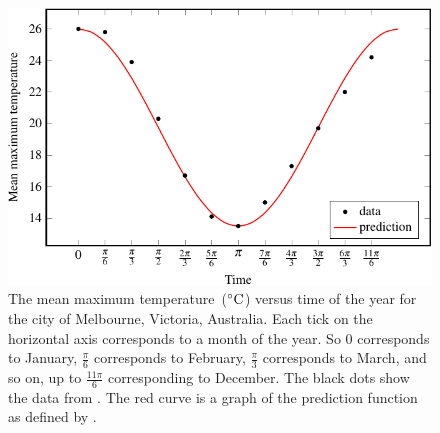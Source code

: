\documentclass[a4paper,oneside,12pt]{article}
\begin{document}

\begin{table}[!htbp]
\centering

\caption{%
  The mean maximum temperature~($\degreec{}$) of each month for the city of
  Melbourne, Victoria, Australia.  The mean was calculated using
  temperature data for the years from $1855$ to $2015$.  The mean
  temperatures are provided by the Bureau of Meteorology of
  Australia.
}
\label{tab:trigonometric:mean_maximum_temperature}
\end{table}

\begin{figure}[!htbp]
\centering
\includegraphics[scale=1.1]{image/13/mean-max-temperature.pdf}
\caption{%
  The mean maximum temperature~($\degreec{}$) versus time of the year
  for the city of Melbourne, Victoria, Australia.  Each tick on the
  horizontal axis corresponds to a month of the year.  So $0$
  corresponds to January, $\frac{\pi}{6}$ corresponds to February,
  $\frac{\pi}{3}$ corresponds to March, and so on, up to
  $\frac{11\pi}{6}$ corresponding to December.  The black dots show
  the data from .
  The red curve is a graph of the prediction function as defined by
  .
}
\label{fig:trigonometric:mean_max_temperature}
\end{figure}
\end{document}
